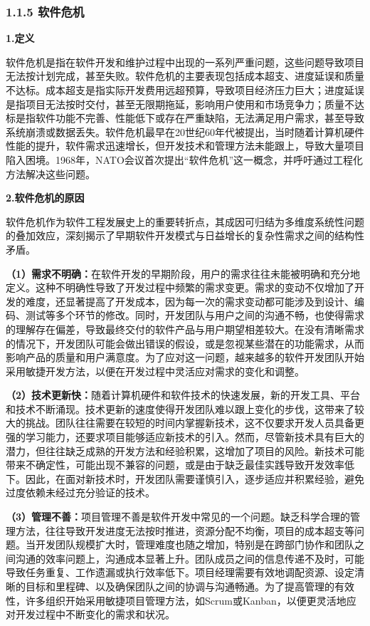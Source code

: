 \subsubsection{1.1.5 软件危机}\label{ux8f6fux4ef6ux5371ux673a}

\textbf{1.定义}

软件危机是指在软件开发和维护过程中出现的一系列严重问题，这些问题导致项目无法按计划完成，甚至失败。软件危机的主要表现包括成本超支、进度延误和质量不达标。成本超支是指实际开发费用远超预算，导致项目经济压力巨大；进度延误是指项目无法按时交付，甚至无限期拖延，影响用户使用和市场竞争力；质量不达标是指软件功能不完善、性能低下或存在严重缺陷，无法满足用户需求，甚至导致系统崩溃或数据丢失。软件危机最早在20世纪60年代被提出，当时随着计算机硬件性能的提升，软件需求迅速增长，但开发技术和管理方法未能跟上，导致大量项目陷入困境。1968年，NATO会议首次提出``软件危机''这一概念，并呼吁通过工程化方法解决这些问题。

\textbf{2.软件危机的原因}

软件危机作为软件工程发展史上的重要转折点，其成因可归结为多维度系统性问题的叠加效应，深刻揭示了早期软件开发模式与日益增长的复杂性需求之间的结构性矛盾。

\textbf{（1）需求不明确：}在软件开发的早期阶段，用户的需求往往未能被明确和充分地定义。这种不明确性导致了开发过程中频繁的需求变更。需求的变动不仅增加了开发的难度，还显著提高了开发成本，因为每一次的需求变动都可能涉及到设计、编码、测试等多个环节的修改。同时，开发团队与用户之间的沟通不畅，也使得需求的理解存在偏差，导致最终交付的软件产品与用户期望相差较大。在没有清晰需求的情况下，开发团队可能会做出错误的假设，或是忽视某些潜在的功能需求，从而影响产品的质量和用户满意度。为了应对这一问题，越来越多的软件开发团队开始采用敏捷开发方法，以便在开发过程中灵活应对需求的变化和调整。

\textbf{（2）技术更新快：}随着计算机硬件和软件技术的快速发展，新的开发工具、平台和技术不断涌现。技术更新的速度使得开发团队难以跟上变化的步伐，这带来了较大的挑战。团队往往需要在较短的时间内掌握新技术，这不仅要求开发人员具备更强的学习能力，还要求项目能够适应新技术的引入。然而，尽管新技术具有巨大的潜力，但往往缺乏成熟的开发方法和经验积累，这增加了项目的风险。新技术可能带来不确定性，可能出现不兼容的问题，或是由于缺乏最佳实践导致开发效率低下。因此，在面对新技术时，开发团队需要谨慎引入，逐步适应并积累经验，避免过度依赖未经过充分验证的技术。

\textbf{（3）管理不善：}项目管理不善是软件开发中常见的一个问题。缺乏科学合理的管理方法，往往导致开发进度无法按时推进，资源分配不均衡，项目的成本超支等问题。当开发团队规模扩大时，管理难度也随之增加，特别是在跨部门协作和团队之间沟通的效率问题上，沟通成本显著上升。团队成员之间的信息传递不及时，可能导致任务重复、工作遗漏或执行效率低下。项目经理需要有效地调配资源、设定清晰的目标和里程碑、以及确保团队之间的协调与沟通畅通。为了提高管理的有效性，许多组织开始采用敏捷项目管理方法，如Scrum或Kanban，以便更灵活地应对开发过程中不断变化的需求和状况。

